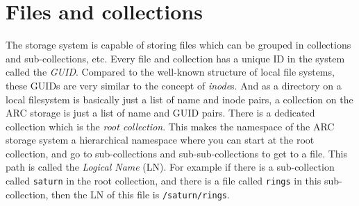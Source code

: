 \documentclass{book}
\begin{document}
\begin{figure}[ht]
\end{figure}

\section{Files and collections} %
\label{sec:files_and_collections}

The storage system is capable of storing files which can be grouped in collections and sub-collections, etc.
Every file and collection has a unique ID in the system called the \emph{GUID}. Compared to the well-known structure of local file systems, these GUIDs are very similar to the concept of \emph{inode}s. And as a directory on a local filesystem is basically just a list of name and inode pairs, a collection on the ARC storage is just a list of name and GUID pairs. There is a dedicated collection which is the \emph{root collection}. This makes the namespace of the ARC storage system a hierarchical namespace where you can start at the root collection, and go to sub-collections and sub-sub-collections to get to a file. This path is called the \emph{Logical Name} (LN). For example if there is a sub-collection called \verb!saturn! in the root collection, and there is a file called \verb!rings! in this sub-collection, then the LN of this file is \verb!/saturn/rings!.
\end{document}
